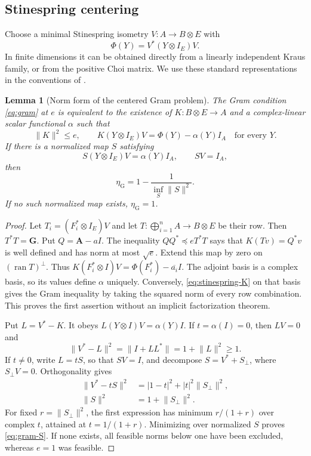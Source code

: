 \documentclass[11pt]{article}
\numberwithin{equation}{section}
\newtheorem{lemma}[theorem]{Lemma}
\theoremstyle{definition}
\theoremstyle{remark}
\DeclareMathOperator{\ran}{ran}
\newcommand{\norm}[1]{\lVert #1\rVert}
\begin{document}
\subsection{Stinespring centering}

Choose a minimal Stinespring isometry $V:A\to B\otimes E$ with
\[
 \Phi(Y)=V^*(Y\otimes I_E)V.
\]
In finite dimensions it can be obtained directly from a linearly independent
Kraus family, or from the positive Choi matrix. We use these standard
representations in the conventions of \cite{Stinespring55,Choi75}.

\begin{lemma}[Norm form of the centered Gram problem]
\label{lem:stinespring-center}
The Gram condition \eqref{eq:gram} at $e$ is equivalent to the existence of
$K:B\otimes E\to A$ and a complex-linear scalar functional $\alpha$ such that
\begin{equation}
 \norm K^2\leq e,\qquad
 K(Y\otimes I_E)V=\Phi(Y)-\alpha(Y)I_A
 \quad\text{for every }Y.
 \label{eq:stinespring-K}
\end{equation}
If there is a normalized map $S$ satisfying
\begin{equation}
 S(Y\otimes I_E)V=\alpha(Y)I_A,\qquad SV=I_A,
 \label{eq:normalized-center}
\end{equation}
then
\begin{equation}
 \eta_{\mathrm G}=1-\frac1{\inf_S\norm S^2}.
 \label{eq:gram-S}
\end{equation}
If no such normalized map exists, $\eta_{\mathrm G}=1$.
\end{lemma}

\begin{proof}
Let $T_i=(F_i^*\otimes I_E)V$ and let
$T:\bigoplus_{i=1}^n A\to B\otimes E$ be their row. Then
$T^*T=\mathbf G$. Put $Q=\mathbf A-aI$.
The inequality $QQ^*\preceq eT^*T$ says that
$K(Tv)=Q^*v$ is well defined and has norm at most $\sqrt e$.
Extend this map by zero on $(\ran T)^\perp$. Thus
$K(F_i^*\otimes I)V=\Phi(F_i^*)-\overline{a_i}I$.
The adjoint basis is a complex basis, so its values define $\alpha$ uniquely.
Conversely, \eqref{eq:stinespring-K} on that basis gives the Gram inequality
by taking the squared norm of every row combination. This proves the first
assertion without an implicit factorization theorem.

Put $L=V^*-K$. It obeys
$L(Y\otimes I)V=\alpha(Y)I$. If $t=\alpha(I)=0$, then $LV=0$ and
\[
 \norm{V^*-L}^2=\norm{I+LL^*}=1+\norm L^2\geq1.
\]
If $t\ne0$, write $L=tS$, so that $SV=I$, and decompose
$S=V^*+S_\perp$, where $S_\perp V=0$. Orthogonality gives
\begin{align}
 \norm{V^*-tS}^2
 &=|1-t|^2+|t|^2\norm{S_\perp}^2, \label{eq:t-minimization}\\
 \norm S^2&=1+\norm{S_\perp}^2. \label{eq:S-norm}
\end{align}
For fixed $r=\norm{S_\perp}^2$, the first expression has minimum
$r/(1+r)$ over complex $t$, attained at $t=1/(1+r)$.
Minimizing over normalized $S$ proves \eqref{eq:gram-S}. If none exists,
all feasible norms below one have been excluded, whereas $e=1$ was feasible.
\end{proof}
\end{document}

